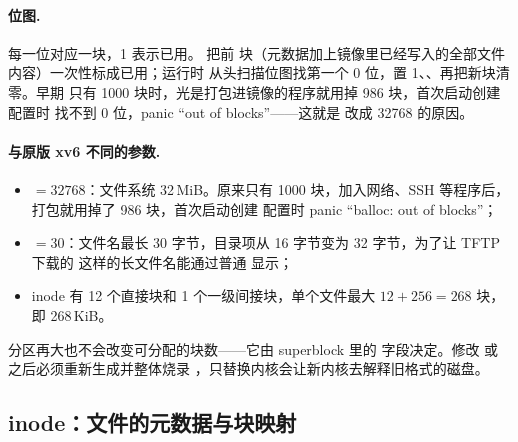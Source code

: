 \paragraph{位图.} 每一位对应一块，1 表示已用。 把前  块（元数据加上镜像里已经写入的全部文件内容）一次性标成已用；运行时  从头扫描位图找第一个 0 位，置 1、、再把新块清零。早期  只有 1000 块时，光是打包进镜像的程序就用掉 986 块，首次启动创建  配置时  找不到 0 位，panic “out of blocks”——这就是  改成 32768 的原因。

\paragraph{与原版 xv6 不同的参数.}

\begin{itemize}
  \item {}$=32768$：文件系统 32\,MiB。原来只有 1000 块，加入网络、SSH 等程序后，打包就用掉了 986 块，首次启动创建  配置时 panic “balloc: out of blocks”；
  \item {}$=30$：文件名最长 30 字节，目录项从 16 字节变为 32 字节，为了让 TFTP 下载的  这样的长文件名能通过普通  显示；
  \item inode 有 12 个直接块和 1 个一级间接块，单个文件最大 $12+256=268$ 块，即 268\,KiB。
\end{itemize}

\begin{note}
  分区再大也不会改变可分配的块数——它由 superblock 里的  字段决定。修改  或  之后必须重新生成并整体烧录 ，只替换内核会让新内核去解释旧格式的磁盘。
\end{note}

\subsection{inode：文件的元数据与块映射}

